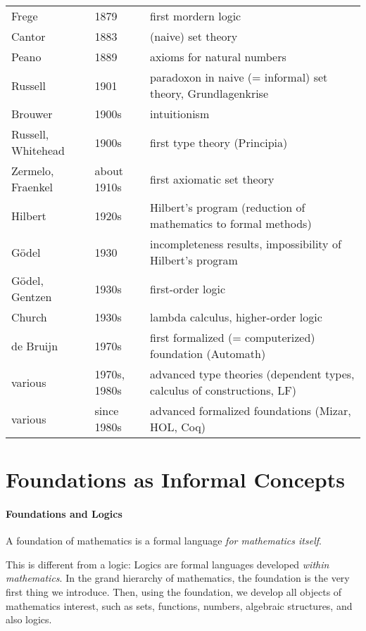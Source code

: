 \begin{center}
\begin{tabular}{|l|l|p{}|}
\hline
Frege & 1879 & first mordern logic \\
Cantor & 1883 & (naive) set theory \\
Peano & 1889 & axioms for natural numbers \\
Russell & 1901 & paradoxon in naive (= informal) set theory, Grundlagenkrise \\
Brouwer & 1900s & intuitionism \\
Russell, Whitehead & 1900s & first type theory (Principia) \\
Zermelo, Fraenkel & about 1910s & first axiomatic set theory \\
Hilbert & 1920s & Hilbert's program (reduction of mathematics to formal methods) \\
G\"odel & 1930 & incompleteness results, impossibility of Hilbert's program \\
G\"odel, Gentzen & 1930s & first-order logic \\
Church & 1930s & lambda calculus, higher-order logic \\
de Bruijn & 1970s & first formalized (= computerized) foundation (Automath) \\
various & 1970s, 1980s & advanced type theories (dependent types, calculus of constructions, LF) \\
various & since 1980s & advanced formalized foundations (Mizar, HOL, Coq) \\
\hline
\end{tabular}
\end{center}

\section{Foundations as Informal Concepts}

\paragraph{Foundations and Logics}
A foundation of mathematics is a formal language \emph{for mathematics itself}.

This is different from a logic: Logics are formal languages developed \emph{within mathematics}. In the grand hierarchy of mathematics, the foundation is the very first thing we introduce. Then, using the foundation, we develop all objects of mathematics interest, such as sets, functions, numbers, algebraic structures, and also logics.

